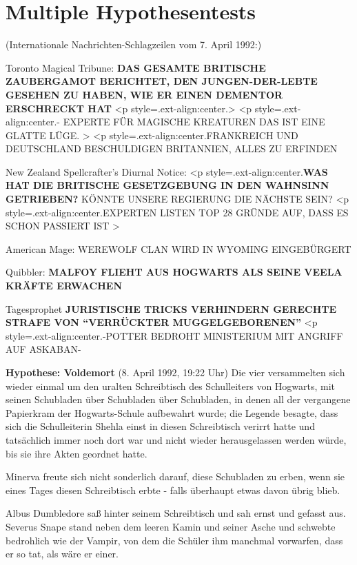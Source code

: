 \chapter{Multiple Hypothesentests}

(Internationale Nachrichten-Schlagzeilen vom 7. April 1992:)

Toronto Magical Tribune:  \textbf{DAS
GESAMTE BRITISCHE ZAUBERGAMOT BERICHTET, DEN \glqq{}JUNGEN-DER-LEBTE\grqq{}
GESEHEN ZU HABEN, WIE ER EINEN DEMENTOR ERSCHRECKT HAT}   <p
style=\grqq{}.ext-align:center\grqq{}.> <p
style=\grqq{}.ext-align:center\grqq{}.- EXPERTE FÜR MAGISCHE KREATUREN \glqq{}DAS
IST EINE GLATTE LÜGE\grqq{}.    > <p
style=\grqq{}.ext-align:center\grqq{}.FRANKREICH UND DEUTSCHLAND BESCHULDIGEN
BRITANNIEN,    ALLES ZU ERFINDEN

New Zealand Spellcrafter's Diurnal Notice: <p
style=\grqq{}.ext-align:center\grqq{}.\textbf{WAS HAT DIE BRITISCHE GESETZGEBUNG
IN DEN WAHNSINN GETRIEBEN?}    KÖNNTE
UNSERE REGIERUNG DIE NÄCHSTE SEIN?   <p
style=\grqq{}.ext-align:center\grqq{}.EXPERTEN LISTEN TOP 28 GRÜNDE AUF, DASS ES
SCHON PASSIERT IST   >

American Mage:  WEREWOLF CLAN WIRD IN
WYOMING EINGEBÜRGERT

Quibbler:  \textbf{MALFOY FLIEHT AUS
HOGWARTS ALS SEINE VEELA KRÄFTE ERWACHEN}

Tagesprophet  \textbf{JURISTISCHE TRICKS
VERHINDERN GERECHTE STRAFE VON “VERRÜCKTER MUGGELGEBORENEN”}  <p
style=\grqq{}.ext-align:center\grqq{}.-POTTER BEDROHT MINISTERIUM MIT ANGRIFF
AUF ASKABAN-

\textbf{Hypothese: Voldemort} (8. April 1992, 19:22 Uhr) Die vier versammelten
sich wieder einmal um den uralten Schreibtisch des Schulleiters von Hogwarts,
mit seinen Schubladen über Schubladen über Schubladen, in denen all der
vergangene Papierkram der Hogwarts-Schule aufbewahrt wurde; die Legende besagte,
dass sich die Schulleiterin Shehla einst in diesen Schreibtisch verirrt hatte
und tatsächlich immer noch dort war und nicht wieder herausgelassen werden
würde, bis sie ihre Akten geordnet hatte.

Minerva freute sich nicht sonderlich darauf, diese Schubladen zu erben, wenn sie
eines Tages diesen Schreibtisch erbte - falls überhaupt etwas davon übrig blieb.

Albus Dumbledore saß hinter seinem Schreibtisch und sah ernst und gefasst aus.
Severus Snape stand neben dem leeren Kamin und seiner Asche und schwebte
bedrohlich wie der Vampir, von dem die Schüler ihm manchmal vorwarfen, dass er
so tat, als wäre er einer.

